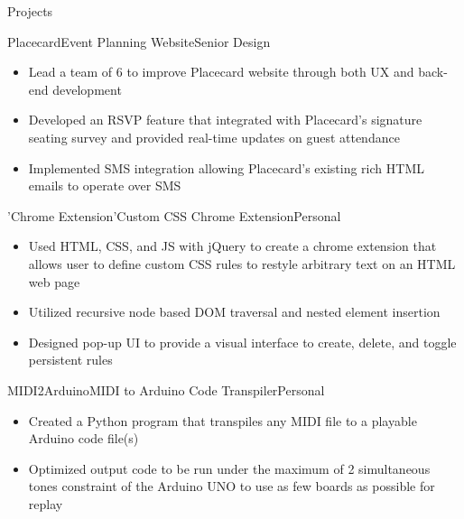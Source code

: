 \documentclass{resume} %
\begin{document}
\begin{rSection}{Projects}
\begin{rSubsection}{Placecard}{}{Event Planning Website}{Senior Design}
\item[]\renewcommand\labelitemi{$\vcenter{\hbox{\tiny$\bullet$}}$} \begin{itemize}
   \item Lead a team of 6 to improve Placecard website through both UX and back-end development
   \vspace{-1mm}
   \item Developed an RSVP feature that integrated with Placecard's signature seating survey and provided real-time updates on guest attendance
   \vspace{-1mm}
   \item Implemented SMS integration allowing Placecard's existing rich HTML emails to operate over SMS
   
\end{itemize}
\end{rSubsection}
\begin{rSubsection}{'Chrome Extension'}{}{Custom CSS Chrome Extension}{Personal}
\item[]\renewcommand\labelitemi{$\vcenter{\hbox{\tiny$\bullet$}}$} \begin{itemize}
   \item Used HTML, CSS, and JS with jQuery to create a chrome extension that allows user to define custom CSS rules to restyle arbitrary text on an HTML web page
   \vspace{-1mm}
   \item Utilized recursive node based DOM traversal and nested element insertion 
   \vspace{-1mm}
   \item Designed pop-up UI to provide a visual interface to create, delete, and toggle persistent rules 
\end{itemize}
\end{rSubsection}
\begin{rSubsection}{MIDI2Arduino}{}{MIDI to Arduino Code Transpiler}{Personal}
\item[]\renewcommand\labelitemi{$\vcenter{\hbox{\tiny$\bullet$}}$} \begin{itemize}
   \item Created a Python program that transpiles any MIDI file to a playable Arduino code file(s)
   \vspace{-1mm}
   \item Optimized output code to be run under the maximum of 2 simultaneous tones constraint of the Arduino UNO to use as few boards as possible for replay
\end{itemize}
\end{rSubsection}

\vspace{-1mm}
\end{rSection}
\vspace{-1mm}
\end{document}
